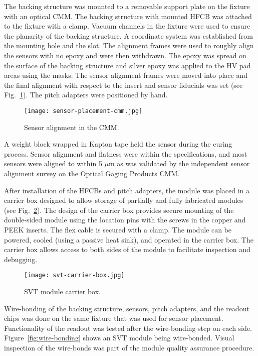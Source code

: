 The backing structure was mounted to a removable support plate on the fixture with an optical CMM. The backing structure with mounted HFCB was attached to the fixture with a clamp. Vacuum channels in the fixture were used to ensure the planarity of the backing structure. A coordinate system was established from the mounting hole and the slot. The alignment frames were used to roughly align the sensors with no epoxy and were then withdrawn. The epoxy was spread on the surface of the backing structure and silver epoxy was applied to the HV pad areas using the masks. The sensor alignment frames were moved into place and the final alignment with respect to the insert and sensor fiducials was set (see Fig.~\ref{fig:sensor-placement-cmm}). The pitch adapters were positioned by hand. 
 
\begin{figure}[h] 
\centering 
\texttt{[image: sensor-placement-cmm.jpg]}
\caption{Sensor alignment in the CMM.}
\label{fig:sensor-placement-cmm}
\end{figure}

 A weight block wrapped in Kapton tape held the sensor during the curing process. Sensor alignment and flatness were within the specifications, and most sensors were aligned to within 5 $\mu$m as was validated by the independent sensor alignment survey on the Optical Gaging Products CMM.

After installation of the HFCBs and pitch adapters, the module was placed in a carrier box designed to allow storage of partially and fully fabricated modules (see Fig.~\ref{fig:svt-carrier-box}). The design of the carrier box provides secure mounting of the double-sided module using the location pins with the screws in the copper and PEEK inserts. The flex cable is secured with a clamp. The module can be powered, cooled (using a passive heat sink), and operated in the carrier box. The carrier box allows access to both sides of the module to facilitate inspection and debugging. 

\begin{figure}[h] 
\centering 
\texttt{[image: svt-carrier-box.jpg]}
\caption{SVT module carrier box.}
\label{fig:svt-carrier-box}
\end{figure}

Wire-bonding of the backing structure, sensors, pitch adapters, and the readout chips was done on the same fixture that was used for sensor placement. Functionality of the readout was tested after the wire-bonding step on each side. Figure~\ref{fig:wire-bonding} shows an SVT module being wire-bonded. Visual inspection of the wire-bonds was part of the module quality assurance procedure.

